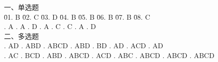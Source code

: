 \documentclass[a4paper]{article}
\begin{document}
\begin{tabbing}
一、单选题\\
\= 01. B \qquad \= 02. C \qquad \= 03. D \qquad \= 04. B \qquad \= 05. B \qquad \= 06. B \qquad \= 07. B \qquad \= 08. C \qquad \= \\
. A . A . D . A . C . C . A . D \\
二、多选题\\
. AD   . ABD  . ABCD . ABD  . BD   . AD   . ACD  . AD\\
. AC   . BCD  . ABD  . ABCD . ACD  . ABC  . ABCD . ABCD . ABCD\\
\end{tabbing}
\end{document}
